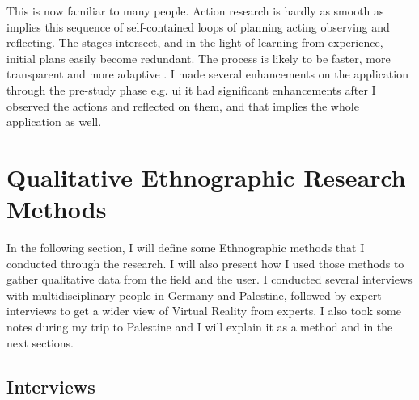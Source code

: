 This  is now familiar to many people. Action research is hardly as smooth as implies this sequence of self-contained loops of planning acting observing and reflecting. The stages intersect, and in the light of learning from experience, initial plans easily become redundant. The process is likely to be faster, more transparent and more adaptive \citep{KemmisSdanMcTaggart1988}. I made several enhancements on the application through the pre-study phase e.g. \acrfull{ui} it had significant enhancements after I observed the actions and reflected on them, and that implies the whole application as well.     


\section{Qualitative Ethnographic Research Methods}

In the following section, I will define some Ethnographic methods that I conducted through the research. I will also present how I used those methods to gather qualitative data from the field and the user. I conducted several interviews with multidisciplinary people in Germany and Palestine, followed by expert interviews to get a wider view of Virtual Reality from experts. I also took some notes during my trip to Palestine and I will explain it as a method and in the next sections.        

\subsection{Interviews}

